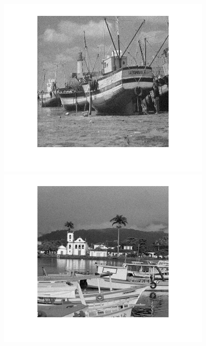 \begin{figure}
{\begin{minipage}[b]{0.23\linewidth}
\includegraphics[width=1\linewidth]{images/gmca_out1.png}\vspace{4pt}
\includegraphics[width=1\linewidth]{images/gmca_out2.png}\vspace{4pt}

\end{minipage}}
\end{figure}
